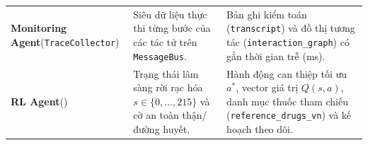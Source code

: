 \begin{table}[H]
\begin{tabularx}{\linewidth}{@{}L{3.3cm}L{4.2cm}Y@{}}
\addlinespace[3pt]
\textbf{Monitoring Agent}\newline (\texttt{TraceCollector}) &
Siêu dữ liệu thực thi từng bước của các tác tử trên \texttt{MessageBus}. &
Bản ghi kiểm toán (\texttt{transcript}) và đồ thị tương tác (\texttt{interaction\_graph}) có gắn thời gian trễ (ms). \\
\addlinespace[3pt]
\textbf{RL Agent}\newline () &
Trạng thái lâm sàng rời rạc hóa $s \in \{0,\dots,215\}$ và cờ an toàn thận/đường huyết. &
Hành động can thiệp tối ưu $a^*$, vector giá trị $Q(s,a)$, danh mục thuốc tham chiếu (\texttt{reference\_drugs\_vn}) và kế hoạch theo dõi. \\
\bottomrule
\end{tabularx}
\end{table}
